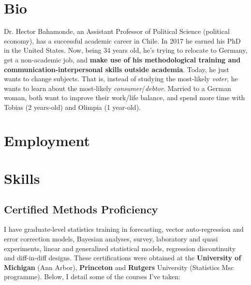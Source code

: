 \documentclass[letterpaper]{article}
\begin{document}
\section*{Bio}

Dr. Hector Bahamonde, an Assistant Professor of Political Science (political economy), has a successful academic career in Chile. In 2017 he earned his PhD in the United States. Now, being 34 years old, he's trying to relocate to Germany, get a non-academic job, and {\bf make use of his methodological training and communication-interpersonal skills outside academia}. Today, he just wants to change subjects. That is, instead of studying the most-likely \emph{voter}, he wants to learn about the most-likely \emph{consumer}/\emph{debtor}. Married to a German woman, both want to improve their work/life balance, and spend more time with Tobias (2 years-old) and Olimpia (1 year-old).



{\unskip}

\section*{Employment}

{\unskip}



\section*{Skills}


\subsection*{Certified Methods Proficiency}

I have graduate-level statistics training in forecasting, vector auto-regression and error correction models, Bayesian analyses, survey, laboratory and quasi experiments, linear and generalized statistical models, regression discontinuity and diff-in-diff designs. These certifications were obtained at the {\bf University of Michigan} (Ann Arbor), {\bf Princeton} and {\bf Rutgers} University (Statistics Msc programme). Below, I detail some of the courses I've taken:
\end{document}

